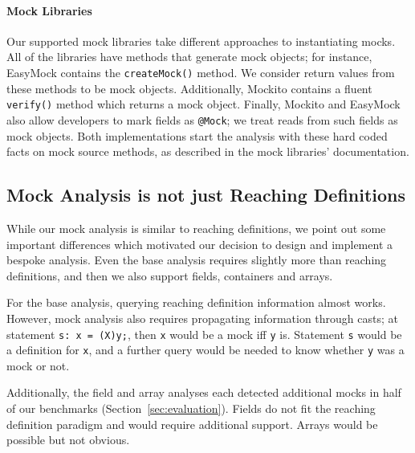 \paragraph{Mock Libraries}
Our supported mock libraries take different approaches to instantiating mocks. All of the libraries have methods that generate mock objects; for instance, EasyMock contains the \texttt{createMock()} method. We consider return values from these methods to be mock objects. Additionally, Mockito contains a fluent \texttt{verify()} method which returns a mock object. Finally, Mockito and EasyMock also allow developers to mark fields as \texttt{@Mock}; we treat reads from such fields as mock objects. Both implementations start the analysis with these hard coded facts on mock source methods, as described in the mock libraries' documentation.

\subsection{Mock Analysis is not just Reaching Definitions}
While our mock analysis is similar to reaching definitions, we point out some important differences which motivated our decision to design and implement a bespoke analysis. Even the base analysis requires slightly more than reaching definitions, and then we also support fields, containers and arrays.

For the base analysis, querying reaching definition information almost works. However, mock analysis also requires propagating information through casts; at statement {\tt s: x = (X)y;}, then {\tt x} would be a mock iff {\tt y} is. Statement {\tt s} would be a definition for {\tt x}, and a further query would be needed to know whether {\tt y} was a mock or not.

Additionally, the field and array analyses each detected additional mocks in half of our benchmarks (Section~\ref{sec:evaluation}). Fields do not fit the reaching definition paradigm and would require additional support. Arrays would be possible but not obvious.

